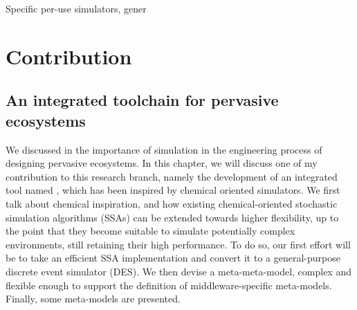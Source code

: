 \documentclass[12pt,a4paper,twoside,openright]{book}
\begin{document}
Specific per-use simulators, gener


\part{Contribution}
\label{contribution}
\chapter{An integrated toolchain for pervasive ecosystems}

We discussed in  the importance of simulation in the engineering process of designing pervasive ecosystems.
%
In this chapter, we will discuss one of my contribution to this research branch, namely the development of an integrated tool named \alchemist{}, which has been inspired by chemical oriented simulators.
%
We first talk about chemical inspiration, and how existing chemical-oriented stochastic simulation algorithms (SSAs) can be extended towards higher flexibility, up to the point that they become suitable to simulate potentially complex environments, still retaining their high performance.
%
To do so, our first effort will be to take an efficient SSA implementation and convert it to a general-purpose discrete event simulator (DES).
%
We then devise a meta-meta-model, complex and flexible enough to support the definition of middleware-specific meta-models.
%
Finally, some meta-models are presented.
%
\end{document}
